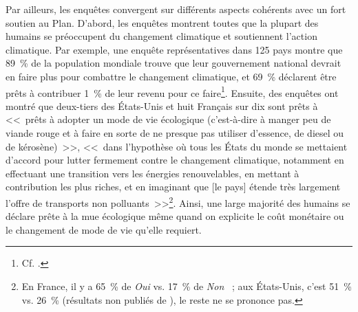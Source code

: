 \documentclass[a5paper,french]{memoir}
\begin{document}
Par ailleurs, les enquêtes convergent sur différents aspects cohérents avec un fort soutien au Plan. D'abord, les enquêtes montrent toutes que la plupart des humains se préoccupent du changement climatique et soutiennent l'action climatique. Par exemple, une enquête représentatives dans 125 pays montre que 89~\% de la population mondiale trouve que leur gouvernement national devrait en faire plus pour combattre le changement climatique, et 69~\% déclarent être prêts à contribuer 1~\% de leur revenu pour ce faire\footnote{Cf. \cite{andre_actual_2024}.}. Ensuite, des enquêtes ont montré que deux-tiers des États-Unis et huit Français sur dix sont prêts à <<~prêts à adopter un mode de vie écologique (c'est-à-dire à manger peu de viande rouge et à faire en sorte de ne presque pas utiliser d'essence, de diesel ou de
kérosène)~>>, <<~dans l'hypothèse où tous les États du monde se mettaient d'accord pour lutter fermement contre le changement climatique, notamment en effectuant une
transition vers les énergies renouvelables, en mettant à contribution les plus riches, et en imaginant que [le pays] étende très largement l'offre de transports non polluants~>>\footnote{En France, il y a 65~\% de \textit{Oui} vs. 17~\% de \textit{Non} \citep{douenne_french_2020}~; aux États-Unis, c'est 51~\% vs. 26~\% (résultats non publiés de \citealp{dechezlepretre_fighting_2022}), le reste ne se prononce pas.}. %
Ainsi, une large majorité des humains se déclare prête à la mue écologique même quand on explicite le coût monétaire ou le changement de mode de vie qu'elle requiert. 
\end{document}
